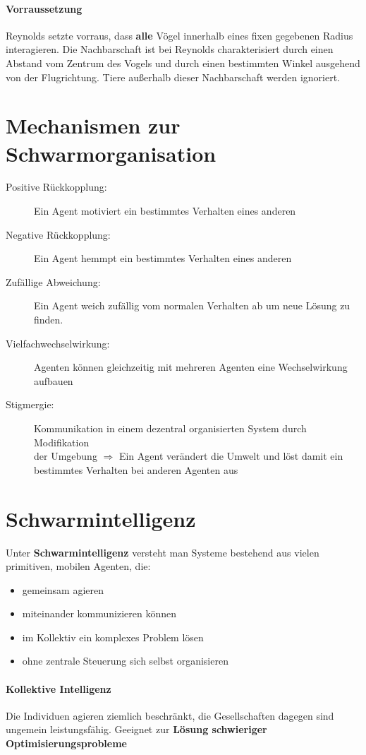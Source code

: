 \paragraph{Vorraussetzung}
Reynolds setzte vorraus, dass \textbf{alle} Vögel innerhalb eines fixen
gegebenen Radius interagieren. Die Nachbarschaft ist bei Reynolds
charakterisiert durch einen Abstand vom Zentrum des Vogels und durch einen
bestimmten Winkel ausgehend von der Flugrichtung. Tiere außerhalb dieser
Nachbarschaft werden ignoriert.

\section{Mechanismen zur Schwarmorganisation}
\begin{description}
	\item[Positive Rückkopplung:] Ein Agent motiviert ein bestimmtes Verhalten
		eines anderen
	\item[Negative Rückkopplung:] Ein Agent hemmpt ein bestimmtes Verhalten eines
		anderen
	\item[Zufällige Abweichung:] Ein Agent weich zufällig vom normalen Verhalten
		ab um neue Lösung zu finden.
	\item[Vielfachwechselwirkung:] Agenten können gleichzeitig mit mehreren
		Agenten eine Wechsel\-wirk\-ung aufbauen
	\item[Stigmergie:] Kommunikation in einem dezentral organisierten System
		durch Modifikation \\ der Umgebung
		$\Rightarrow$ Ein Agent verändert die Umwelt und löst damit ein bestimmtes
			Verhalten bei anderen Agenten aus
\end{description}

\section{Schwarmintelligenz}
Unter \textbf{Schwarmintelligenz} versteht man Systeme bestehend aus vielen
primitiven, mobilen Agenten, die:
\begin{itemize}
	\item gemeinsam agieren
	\item miteinander kommunizieren können
	\item im Kollektiv ein komplexes Problem lösen
	\item ohne zentrale Steuerung sich selbst organisieren
\end{itemize}

\paragraph{Kollektive Intelligenz} Die Individuen agieren ziemlich beschränkt,
die Gesellschaften dagegen sind ungemein leistungsfähig. Geeignet zur
\textbf{Lösung schwieriger Optimisierungsprobleme}

